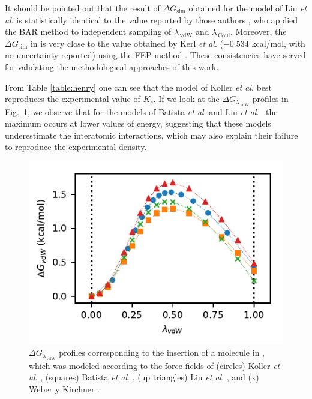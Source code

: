 \documentclass[3p,twocolumn]{elsarticle}
\begin{document}
It should be pointed out that the result of $\Delta G_\text{sim}$ obtained for the model of Liu \textit{et al}. \cite{Liu_2014} is statistically identical to the value reported by those authors \cite{Liu_2014_1}, who applied the BAR method \cite{Bennett_1976} to independent sampling of $\lambda_{\,\text{vdW}}$ and $\lambda_{\, \text{Coul}}$.
Moreover, the $\Delta G_\text{sim}$ in \ce{[emim][NTf_2]} is very close to the value obtained by Kerl \textit{et al}. \cite{Kerl__2017} ($-0.534$ kcal/mol, with no uncertainty reported) using the FEP method \cite{Zwanzig_1954}.
These consistencies have served for validating the methodological approaches of this work.

From Table \ref{table:henry} one can see that the model of Koller \textit{et al}. \cite{Koller_2012} best reproduces the experimental value of $K_s$.
If we look at the $\Delta G_{\lambda_{\,\text{vdW}}}$ profiles in Fig.~\ref{fig:deltag}, we observe that for the models of Batista \textit{et al}. \cite{Batista_2015} and Liu \textit{et al}.~\cite{Liu_2014} the maximum occurs at lower values of energy, suggesting that these models underestimate the interatomic interactions, which may also explain their failure to reproduce the experimental density.

\begin{figure}[ht]
\includegraphics[width=\linewidth]{free_energy_paper}
\caption{$\Delta G_{\lambda_{\,\text{vdW}}}$ profiles corresponding to the insertion of a  molecule in \ce{[emim][B(CN)_4]}, which was modeled according to the force fields of (circles) Koller \textit{et al}. \cite{Koller_2012}, (squares) Batista \textit{et al}. \cite{Batista_2015}, (up triangles) Liu \textit{et al}. \cite{Liu_2014}, and (x) Weber y Kirchner \cite{Weber_2016}.}
\label{fig:deltag}
\end{figure}
\end{document}
